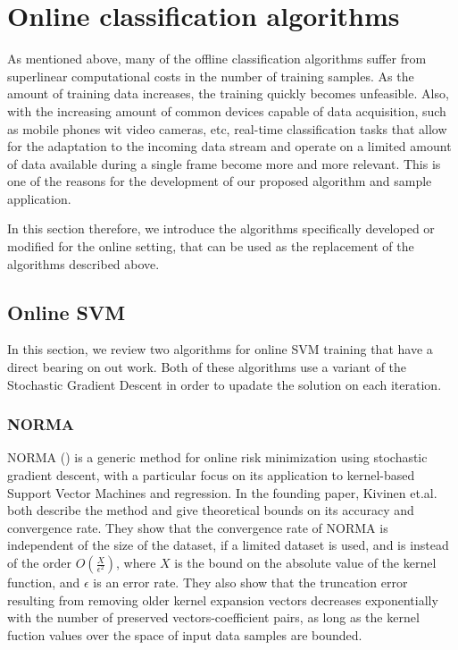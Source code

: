 \section{Online classification algorithms}

As mentioned above, many of the offline classification algorithms suffer from superlinear computational costs in the number of training samples. As the amount of training data increases, the training quickly becomes unfeasible. Also, with the increasing amount of common devices capable of data acquisition, such as mobile phones wit video cameras, etc, real-time classification tasks that allow for the adaptation to the incoming data stream and operate on a limited amount of data available during a single frame become more and more relevant. This is one of the reasons for the development of our proposed algorithm and sample application.  

In this section therefore, we introduce the algorithms specifically developed or modified for the online setting, that can be used as the replacement of the algorithms described above. 
\subsection{Online SVM}
In this section, we review two algorithms for online SVM training that have a direct bearing on out work. Both of these algorithms use a variant of the Stochastic Gradient Descent in order to upadate the solution on each iteration. 
\subsubsection{NORMA}
\label{NORMAIntro}
NORMA (\cite{Norma}) is a generic method for online risk minimization using stochastic gradient descent, with a particular focus on its application to kernel-based Support Vector Machines and regression. In the founding paper,  Kivinen et.al. both describe the method and give theoretical  bounds on its accuracy and convergence rate. They show that the convergence rate of NORMA is independent of the size of the dataset, if a limited dataset is used, and is instead of the order $O(\frac{X}{\epsilon^2})$, where $X$ is the bound on the absolute value of the kernel function, and $\epsilon$ is an error rate. 
They also show that the truncation error resulting from removing older kernel expansion vectors decreases exponentially with the number of preserved vectors-coefficient pairs, as long as the kernel fuction values over the space of input data samples are bounded. 

